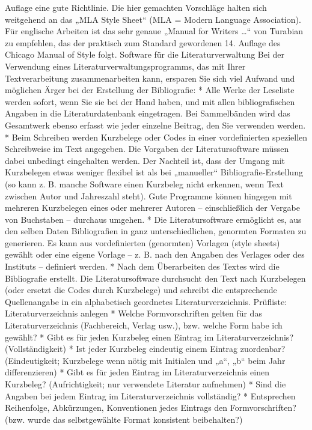 \documentclass[]{book}
\theoremstyle{definition}
\theoremstyle{definition}
\theoremstyle{definition}
\theoremstyle{remark}
\begin{document}
Auflage eine gute Richtlinie. Die hier gemachten Vorschläge halten sich
weitgehend an das „MLA Style Sheet`` (MLA = Modern Language
Association). Für englische Arbeiten ist das sehr genaue „Manual for
Writers \ldots{}`` von Turabian zu empfehlen, das der praktisch zum
Standard gewordenen 14. Auflage des Chicago Manual of Style folgt.
Software für die Literaturverwaltung Bei der Verwendung eines
Literaturverwaltungsprogramms, das mit Ihrer Textverarbeitung
zusammenarbeiten kann, ersparen Sie sich viel Aufwand und möglichen
Ärger bei der Erstellung der Bibliografie: * Alle Werke der Leseliste
werden sofort, wenn Sie sie bei der Hand haben, und mit allen
bibliografischen Angaben in die Literaturdatenbank eingetragen. Bei
Sammelbänden wird das Gesamtwerk ebenso erfasst wie jeder einzelne
Beitrag, den Sie verwenden werden. * Beim Schreiben werden Kurzbelege
oder Codes in einer vordefinierten speziellen Schreibweise im Text
angegeben. Die Vorgaben der Literatursoftware müssen dabei unbedingt
eingehalten werden. Der Nachteil ist, dass der Umgang mit Kurzbelegen
etwas weniger flexibel ist als bei „manueller`` Bibliografie-Erstellung
(so kann z. B. manche Software einen Kurzbeleg nicht erkennen, wenn Text
zwischen Autor und Jahreszahl steht). Gute Programme können hingegen mit
mehreren Kurzbelegen eines oder mehrerer Autoren -- einschließlich der
Vergabe von Buchstaben -- durchaus umgehen. * Die Literatursoftware
ermöglicht es, aus den selben Daten Bibliografien in ganz
unterschiedlichen, genormten Formaten zu generieren. Es kann aus
vordefinierten (genormten) Vorlagen (style sheets) gewählt oder eine
eigene Vorlage -- z. B. nach den Angaben des Verlages oder des Instituts
-- definiert werden. * Nach dem Überarbeiten des Textes wird die
Bibliografie erstellt. Die Literatursoftware durchsucht den Text nach
Kurzbelegen (oder ersetzt die Codes durch Kurzbelege) und schreibt die
entsprechende Quellenangabe in ein alphabetisch geordnetes
Literaturverzeichnis. Prüfliste: Literaturverzeichnis anlegen * Welche
Formvorschriften gelten für das Literaturverzeichnis (Fachbereich,
Verlag usw.), bzw. welche Form habe ich gewählt? * Gibt es für jeden
Kurzbeleg einen Eintrag im Literaturverzeichnis? (Vollständigkeit) * Ist
jeder Kurzbeleg eindeutig einem Eintrag zuordenbar? (Eindeutigkeit;
Kurzbelege wenn nötig mit Initialen und „a``, „b`` beim Jahr
differenzieren) * Gibt es für jeden Eintrag im Literaturverzeichnis
einen Kurzbeleg? (Aufrichtigkeit; nur verwendete Literatur aufnehmen) *
Sind die Angaben bei jedem Eintrag im Literaturverzeichnis vollständig?
* Entsprechen Reihenfolge, Abkürzungen, Konventionen jedes Eintrags den
Formvorschriften? (bzw. wurde das selbstgewählte Format konsistent
beibehalten?)
\end{document}

